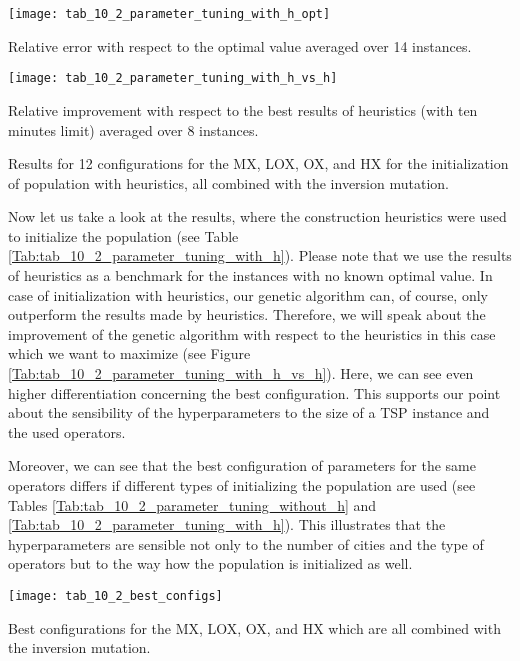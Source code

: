 \begin{table}[htp] \centering
	\begin{subtable}[t]{0.45\textwidth}
		\texttt{[image: tab\_10\_2\_parameter\_tuning\_with\_h\_opt]}
		\caption{Relative error with respect to the optimal value averaged over 14 instances.}
		\label{Tab:tab_10_2_parameter_tuning_with_h_opt}
	\end{subtable}
	\hfill
	\begin{subtable}[t]{0.5\textwidth}
		\centering
		\texttt{[image: tab\_10\_2\_parameter\_tuning\_with\_h\_vs\_h]}
		\caption{Relative improvement with respect to the best results of heuristics (with ten minutes limit) averaged over 8 instances.}
		\label{Tab:tab_10_2_parameter_tuning_with_h_vs_h}
	\end{subtable}	
	\caption{Results for 12 configurations for the MX, LOX, OX, and HX for the initialization of population with heuristics, all combined with the inversion mutation.}
	\label{Tab:tab_10_2_parameter_tuning_with_h}
\end{table}


Now let us take a look at the results, where the construction heuristics were used to initialize the population (see Table \ref{Tab:tab_10_2_parameter_tuning_with_h}). Please note that we use the results of heuristics as a benchmark for the instances with no known optimal value. In case of initialization with heuristics, our genetic algorithm can, of course, only outperform the results made by heuristics. Therefore, we will speak about the improvement of the genetic algorithm with respect to the heuristics in this case which we want to maximize (see Figure \ref{Tab:tab_10_2_parameter_tuning_with_h_vs_h}). Here, we can see even higher differentiation concerning the best configuration. This supports our point about the sensibility of the hyperparameters to the size of a TSP instance and the used operators. \par 

Moreover, we can see that the best configuration of parameters for the same operators differs if different types of initializing the population are used (see Tables \ref{Tab:tab_10_2_parameter_tuning_without_h} and \ref{Tab:tab_10_2_parameter_tuning_with_h}). This illustrates that the hyperparameters are sensible not only to the number of cities and the type of operators but to the way how the population is initialized as well.\par 

\begin{table}[htp] \centering
	\texttt{[image: tab\_10\_2\_best\_configs]}
	\caption{Best configurations for the MX, LOX, OX, and HX which are all combined with the inversion mutation.}
	\label{Tab:tab_10_2_best_configs}
\end{table}	

